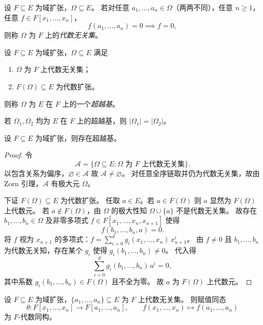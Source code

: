 \documentclass[lang=cn,a4paper,newtx]{elegantbook}
\begin{document}
\begin{definition}[代数无关集]
  设 $F\subseteq E$ 为域扩张，$\Omega\subseteq E$。
  若对任意 $a_1,\dots,a_n\in\Omega$（两两不同），任意 $n\ge 1$，任意 $f\in F[x_1,\dots,x_n]$，
  \[
    f(a_1,\dots,a_n)=0\implies f=0,
  \]
  则称 $\Omega$ 为 $F$ 上的\emph{代数无关集}。
\end{definition}

\begin{definition}[超越基]
  设 $F\subseteq E$ 为域扩张，$\Omega\subseteq E$ 满足
  \begin{enumerate}
    \item $\Omega$ 为 $F$ 上代数无关集；
    \item $F(\Omega)\subseteq E$ 为代数扩张。
  \end{enumerate}
  则称 $\Omega$ 为 $E$ 在 $F$ 上的一个\emph{超越基}。
\end{definition}

\begin{remark}
  若 $\Omega_1,\Omega_2$ 均为 $E$ 在 $F$ 上的超越基，则 $|\Omega_1|=|\Omega_2|$。
\end{remark}

\begin{proposition}
  设 $F\subseteq E$ 为域扩张，则存在超越基。
\end{proposition}

\begin{proof}
  令
  \[
    \mathcal{A}=\{\Omega\subseteq E: \Omega\text{ 为 }F\text{ 上代数无关集}\}.
  \]
  以包含关系为偏序，$\varnothing\in\mathcal{A}$ 故 $\mathcal{A}\ne\varnothing$。
  对任意全序链取并仍为代数无关集，故由 Zorn 引理，$\mathcal{A}$ 有极大元 $\Omega$。

  下证 $F(\Omega)\subseteq E$ 为代数扩张。
  任取 $a\in E$。若 $a\in F(\Omega)$ 则 $a$ 显然为 $F(\Omega)$ 上代数元。
  若 $a\notin F(\Omega)$，由 $\Omega$ 的极大性知 $\Omega\cup\{a\}$ 不是代数无关集。
  故存在 $b_1,\dots,b_n\in\Omega$ 及非零多项式 $f\in F[x_1,\dots,x_n,x_{n+1}]$ 使得
  \[
    f(b_1,\dots,b_n,a)=0.
  \]
  将 $f$ 视为 $x_{n+1}$ 的多项式：$f=\sum_{i=0}^{d}g_i(x_1,\dots,x_n)\,x_{n+1}^i$。
  由 $f\ne 0$ 且 $b_1,\dots,b_n$ 为代数无关知，存在某个 $g_i$ 使得 $g_i(b_1,\dots,b_n)\ne 0$。
  代入得
  \[
    \sum_{i=0}^{d}g_i(b_1,\dots,b_n)\,a^i=0,
  \]
  其中系数 $g_i(b_1,\dots,b_n)\in F(\Omega)$ 且不全为零。
  故 $a$ 为 $F(\Omega)$ 上代数元。
\end{proof}

\begin{proposition}
  设 $F\subseteq E$ 为域扩张，$\{a_1,\dots,a_n\}\subseteq E$ 为 $F$ 上代数无关集。
  则赋值同态
  \[
    \theta\colon F[x_1,\dots,x_n]\to F[a_1,\dots,a_n],\qquad f(x_1,\dots,x_n)\mapsto f(a_1,\dots,a_n)
  \]
  为 $F$-代数同构。
\end{proposition}
\end{document}
